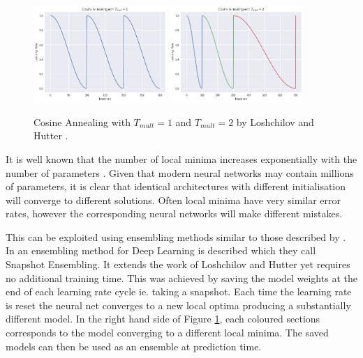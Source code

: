 \begin{figure}[hbtp!]
    \centering
    \includegraphics[width=0.45\textwidth]{./img/tmul1.png}
    \includegraphics[width=0.45\textwidth]{./img/tmul2.png}
    \caption{Cosine Annealing with $T_{mult}=1$ and $T_{mult}=2$ by Loshchilov and Hutter \cite{Loshchilov_Hutter_2016}.}
    \label{fig:cosine_annealing}
\end{figure}

It is well known that the number of local minima increases exponentially with the number of parameters \cite{Kawaguchi_2016}.
Given that modern neural networks may contain millions of parameters, it is clear that identical architectures with different initialisation will converge to different solutions.
Often local minima have very similar error rates, however the corresponding neural networks will make different mistakes.

This can be exploited using ensembling methods similar to those described by \cite{Caruana_Niculescu-Mizil_Crew_Ksikes_2004}.
In \cite{Huang_Li_Pleiss_Liu_Hopcroft_Weinberger_2017} an ensembling method for Deep Learning is described which they call Snapshot Ensembling.
It extends the work of Loshchilov and Hutter \cite{Loshchilov_Hutter_2016} yet requires no additional training time.
This was achieved by saving the model weights at the end of each learning rate cycle ie. taking a snapshot.
Each time the learning rate is reset the neural net converges to a new local optima producing a substantially different model.
In the right hand side of Figure \ref{fig:cosine_annealing}, each coloured sections corresponds to the model converging to a different local minima.
The saved models can then be used as an ensemble at prediction time.


